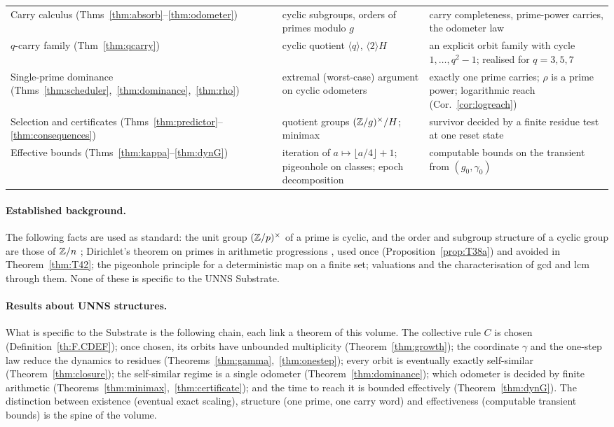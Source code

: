 \begin{longtable}{@{}p{34mm}p{36mm}p{52mm}@{}}
Carry calculus (Thms~\ref{thm:absorb}--\ref{thm:odometer}) & cyclic subgroups, orders of primes modulo \(g\) & carry completeness, prime-power carries, the odometer law\\
\(q\)-carry family (Thm~\ref{thm:qcarry}) & cyclic quotient \(\langle q\rangle\), \(\langle2\rangle H\) & an explicit orbit family with cycle \(1,\dots,q^2-1\); realised for \(q=3,5,7\)\\
Single-prime dominance (Thms~\ref{thm:scheduler},~\ref{thm:dominance},~\ref{thm:rho}) & extremal (worst-case) argument on cyclic odometers & exactly one prime carries; \(\rho\) is a prime power; logarithmic reach (Cor.~\ref{cor:logreach})\\
Selection and certificates (Thms~\ref{thm:predictor}--\ref{thm:consequences}) & quotient groups \((\mathbb{Z}/g)^\times/H\); minimax & survivor decided by a finite residue test at one reset state\\
Effective bounds (Thms~\ref{thm:kappa}--\ref{thm:dynG}) & iteration of \(a\mapsto\lfloor a/4\rfloor+1\); pigeonhole on classes; epoch decomposition & computable bounds on the transient from \((g_0,\gamma_0)\)\\
\bottomrule
\end{longtable}
\normalsize

\paragraph{Established background.} The following facts are used as standard: the unit group \((\mathbb{Z}/p)^\times\) of a prime is cyclic, and the order and subgroup structure of a cyclic group are those of \(\mathbb{Z}/n\) \cite{ireland,hardy}; Dirichlet's theorem on primes in arithmetic progressions \cite{apostol}, used once (Proposition~\ref{prop:T38a}) and avoided in Theorem~\ref{thm:T42}; the pigeonhole principle for a deterministic map on a finite set; valuations and the characterisation of gcd and lcm through them. None of these is specific to the UNNS Substrate.

\paragraph{Results about UNNS structures.} What is specific to the Substrate is the following chain, each link a theorem of this volume. The collective rule \(C\) is chosen (Definition~\ref{th:F.CDEF}); once chosen, its orbits have unbounded multiplicity (Theorem~\ref{thm:growth}); the coordinate \(\gamma\) and the one-step law reduce the dynamics to residues (Theorems~\ref{thm:gamma},~\ref{thm:onestep}); every orbit is eventually exactly self-similar (Theorem~\ref{thm:closure}); the self-similar regime is a single odometer (Theorem~\ref{thm:dominance}); which odometer is decided by finite arithmetic (Theorems~\ref{thm:minimax},~\ref{thm:certificate}); and the time to reach it is bounded effectively (Theorem~\ref{thm:dynG}). The distinction between existence (eventual exact scaling), structure (one prime, one carry word) and effectiveness (computable transient bounds) is the spine of the volume.

